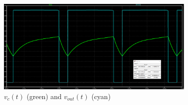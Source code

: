 \documentclass[12pt]{article}
\begin{document}
\begin{enumerate}[label=\alph*)]
\begin{figure}[h!]
        \centering
        \includegraphics[width=0.86\textwidth]{4c.png}
        \caption{$v_c(t)$ (green) and $v_{out}(t)$ (cyan)}
        \label{Fig:4c}     
    \end{figure}
    
\end{enumerate}
\end{document}

